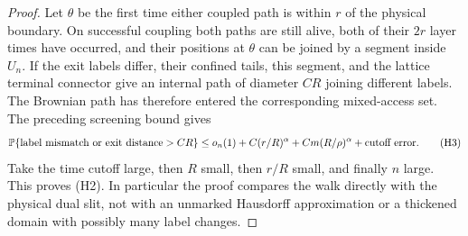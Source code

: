\begin{proof}
Let $\theta$ be the first time either coupled path is within
$r$ of the physical boundary. On successful coupling both
paths are still alive, both of their $2r$ layer times have
occurred, and their positions at $\theta$ can be joined by a
segment inside $U_n$. If the exit labels differ, their confined
tails, this segment, and the lattice terminal connector give
an internal path of diameter $CR$ joining different labels.
The Brownian path has therefore entered the corresponding
mixed-access set. The preceding screening bound gives
\[
 \mathbb P\{\text{label mismatch or exit distance}>CR\}
 \le o_n(1)+C(r/R)^\alpha+Cm(R/\rho)^\alpha
       +\text{cutoff error}.                              \tag{H3}
\]
Take the time cutoff large, then $R$ small, then $r/R$ small,
and finally $n$ large. This proves (H2).
In particular the proof compares the walk directly with the
physical dual slit, not with an unmarked Hausdorff approximation
or a thickened domain with possibly many label changes.
\end{proof}

